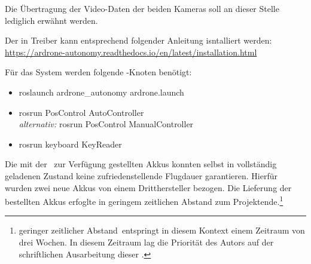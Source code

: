 Die Übertragung der Video-Daten der beiden Kameras soll an dieser Stelle lediglich erwähnt werden.




















Der in  Treiber kann entsprechend folgender Anleitung isntalliert werden:
\href{https://ardrone-autonomy.readthedocs.io/en/latest/installation.html}{https://ardrone-autonomy.readthedocs.io/en/latest/installation.html}

Für das System werden folgende \ROS-Knoten benötigt:
\begin{itemize}
\item roslaunch ardrone\_autonomy ardrone.launch
\item rosrun PosControl AutoController\\
\textit{alternativ:} rosrun PosControl ManualController
\item rosrun keyboard KeyReader
\end{itemize}



Die mit der \Ar\ zur Verfügung gestellten Akkus konnten selbst in vollständig geladenen Zustand keine zufriedenstellende Flugdauer garantieren. Hierfür wurden zwei neue Akkus von einem Dritthersteller bezogen. Die Lieferung der bestellten Akkus erfoglte in geringem zeitlichen Abstand zum Projektende.\footnote{\glqq geringer zeitlicher Abstand\grqq\ entspringt in diesem Kontext einem Zeitraum von drei Wochen. In diesem Zeitraum lag die Priorität des Autors auf der schriftlichen Ausarbeitung dieser \Arbeit.}




















